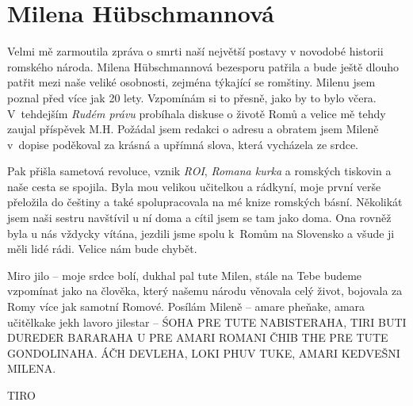 \section{Milena Hübschmannová}

\noindent
Velmi mě zarmoutila zpráva o smrti naší největší postavy v novodobé historii romského národa. Milena Hübschmannová bezesporu patřila a bude ještě dlouho patřit mezi naše veliké osobnosti, zejména týkající se romštiny. Milenu jsem poznal před více jak 20 lety. Vzpomínám si to přesně, jako by to bylo včera. V tehdejším \textit{Rudém právu} probíhala diskuse o životě Romů a velice mě tehdy zaujal příspěvek M.H. Požádal jsem redakci o adresu a obratem jsem Mileně v dopise poděkoval za krásná a upřímná slova, která vycházela ze srdce.

Pak přišla sametová revoluce, vznik \textit{ROI}, \textit{Romana kurka} a romských tiskovin a naše cesta se spojila. Byla mou velikou učitelkou a rádkyní, moje první verše přeložila do češtiny a také spolupracovala na mé knize romských básní. Několikát jsem naši sestru navštívil u ní doma a cítil jsem se tam jako doma. Ona rovněž  byla u nás  vždycky vítána, jezdili jsme spolu k Romům na Slovensko a všude ji měli lidé rádi.
Velice nám bude chybět.

Miro jilo – moje srdce bolí, dukhal pal tute Milen, stále na Tebe budeme vzpomínat jako na člověka, který našemu národu věnovala celý život, bojovala za Romy více jak samotní Romové. Posílám Mileně – amare pheňake, amara učitělkake  jekh lavoro jilestar – ŚOHA PRE TUTE NABISTERAHA, TIRI BUTI DUREDER BARARAHA U PRE AMARI ROMANI ČHIB THE PRE TUTE GONDOLINAHA. ÁČH DEVLEHA, LOKI PHUV TUKE, AMARI KEDVEŠNI MILENA.

\noindent
TIRO

